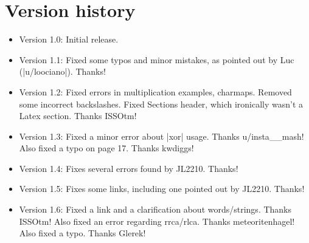\documentclass[11pt]{book}
\begin{document}
\chapter{Version history}
\begin{itemize}
\item Version 1.0: Initial release.
\item Version 1.1: Fixed some typos and minor mistakes, as pointed out by Luc (|u/loociano|). Thanks!
\item Version 1.2: Fixed errors in multiplication examples, charmaps. Removed some incorrect backslashes. Fixed Sections header, which ironically wasn't a Latex section. Thanks ISSOtm!
\item Version 1.3: Fixed a minor error about |xor| usage. Thanks u/insta\_\_mash! Also fixed a typo on page 17. Thanks kwdiggs!
\item Version 1.4: Fixes several errors found by JL2210. Thanks!
\item Version 1.5: Fixes some links, including one pointed out by JL2210. Thanks!
\item Version 1.6: Fixed a link and a clarification about words/strings. Thanks ISSOtm! Also fixed an error regarding rrca/rlca. Thanks meteoritenhagel! Also fixed a typo. Thanks Glerek!
\end{itemize}
\end{document}
